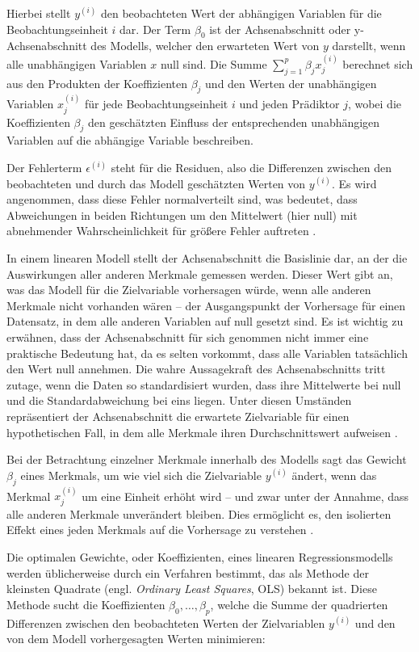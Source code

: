 Hierbei stellt $y^{(i)}$ den beobachteten Wert der abhängigen Variablen für die Beobachtungseinheit
$i$ dar. Der Term $\beta_0$ ist der Achsenabschnitt oder y-Achsenabschnitt des Modells, 
welcher den erwarteten Wert von $y$ darstellt, wenn alle unabhängigen Variablen $x$ null sind. 
Die Summe $\sum_{j=1}^{p} \beta_j x^{(i)}_j$ berechnet sich aus den Produkten der Koeffizienten 
$\beta_j$ und den Werten der unabhängigen Variablen $x^{(i)}_j$ für jede Beobachtungseinheit $i$ 
und jeden Prädiktor $j$, wobei die Koeffizienten $\beta_j$ den geschätzten Einfluss der 
entsprechenden unabhängigen Variablen auf die abhängige Variable beschreiben.

Der Fehlerterm $\epsilon^{(i)}$ steht für die Residuen, also die Differenzen zwischen den beobachteten 
und durch das Modell geschätzten Werten von $y^{(i)}$. Es wird angenommen, dass diese Fehler normalverteilt sind, 
was bedeutet, dass Abweichungen in beiden Richtungen um den Mittelwert (hier null) 
mit abnehmender Wahrscheinlichkeit für größere Fehler auftreten \cite[S. 37]{Molnar_2022}.

In einem linearen Modell stellt der Achsenabschnitt die Basislinie dar, an der die Auswirkungen aller 
anderen Merkmale gemessen werden. Dieser Wert gibt an, was das Modell für die Zielvariable vorhersagen 
würde, wenn alle anderen Merkmale nicht vorhanden wären – der Ausgangspunkt der Vorhersage 
für einen Datensatz, in dem alle anderen Variablen auf null gesetzt sind. 
Es ist wichtig zu erwähnen, dass der Achsenabschnitt für sich genommen nicht immer eine praktische 
Bedeutung hat, da es selten vorkommt, dass alle Variablen tatsächlich den Wert null annehmen. 
Die wahre Aussagekraft des Achsenabschnitts tritt zutage, wenn die Daten so standardisiert wurden, 
dass ihre Mittelwerte bei null und die Standardabweichung bei eins liegen. Unter diesen Umständen repräsentiert der Achsenabschnitt 
die erwartete Zielvariable für einen hypothetischen Fall, in dem alle Merkmale ihren Durchschnittswert 
aufweisen \cite[S. 39]{Molnar_2022}.

Bei der Betrachtung einzelner Merkmale innerhalb des Modells sagt das Gewicht $\beta_j$ eines Merkmals, 
um wie viel sich die Zielvariable $y^{(i)}$ ändert, wenn das Merkmal $x^{(i)}_j$ um eine Einheit erhöht wird – und zwar unter 
der Annahme, dass alle anderen Merkmale unverändert bleiben. 
Dies ermöglicht es, den isolierten Effekt eines jeden Merkmals auf die Vorhersage zu verstehen \cite[S. 39]{Molnar_2022}.

Die optimalen Gewichte, oder Koeffizienten, eines linearen Regressionsmodells werden üblicherweise durch ein Verfahren bestimmt, 
das als Methode der kleinsten Quadrate (engl. \textit{Ordinary Least Squares}, OLS) bekannt ist. 
Diese Methode sucht die Koeffizienten \( \beta_0, \ldots, \beta_p \), welche die Summe der quadrierten 
Differenzen zwischen den beobachteten Werten der Zielvariablen \( y^{(i)} \) und den von dem Modell 
vorhergesagten Werten minimieren:

